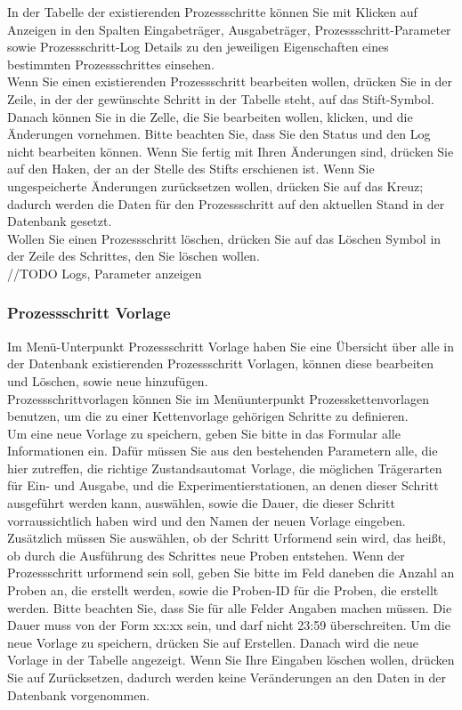 \documentclass[enabledeprecatedfontcommands,fontsize=12pt,paper=a4,twoside]{scrartcl}
\begin{document}
In der Tabelle der existierenden Prozessschritte können Sie mit Klicken auf Anzeigen in den Spalten Eingabeträger, Ausgabeträger, Prozessschritt-Parameter sowie Prozessschritt-Log Details zu den jeweiligen Eigenschaften eines bestimmten Prozessschrittes einsehen. \\

Wenn Sie einen existierenden Prozessschritt bearbeiten wollen, drücken Sie in der Zeile, in der der gewünschte Schritt in der Tabelle steht, auf das Stift-Symbol. Danach können Sie in die Zelle, die Sie bearbeiten wollen, klicken, und die Änderungen vornehmen. Bitte beachten Sie, dass Sie den Status und den Log nicht bearbeiten können. Wenn Sie fertig mit Ihren Änderungen sind, drücken Sie auf den Haken, der an der Stelle des Stifts erschienen ist. Wenn Sie ungespeicherte Änderungen zurücksetzen wollen, drücken Sie auf das Kreuz; dadurch werden die Daten für den Prozessschritt auf den aktuellen Stand in der Datenbank gesetzt. \\


Wollen Sie einen Prozessschritt löschen, drücken Sie auf das Löschen Symbol in der Zeile des Schrittes, den Sie löschen wollen. \\

//TODO Logs, Parameter anzeigen
\subsubsection{Prozessschritt Vorlage}

Im Menü-Unterpunkt Prozessschritt Vorlage haben Sie eine Übersicht über alle in der Datenbank existierenden Prozessschritt Vorlagen, können diese bearbeiten und Löschen, sowie neue hinzufügen. \\

Prozessschrittvorlagen können Sie im Menüunterpunkt Prozesskettenvorlagen benutzen, um die zu einer Kettenvorlage gehörigen Schritte zu definieren. \\

Um eine neue Vorlage zu speichern, geben Sie bitte in das Formular alle Informationen ein. Dafür müssen Sie aus den bestehenden Parametern alle, die hier zutreffen, die richtige Zustandsautomat Vorlage, die möglichen Trägerarten für Ein- und Ausgabe, und die Experimentierstationen, an denen dieser Schritt ausgeführt werden kann, auswählen, sowie die Dauer, die dieser Schritt vorraussichtlich haben wird und den Namen der neuen Vorlage eingeben. Zusätzlich müssen Sie auswählen, ob der Schritt Urformend sein wird, das heißt, ob durch die Ausführung des Schrittes neue Proben entstehen. Wenn der Prozessschritt urformend sein soll, geben Sie bitte im Feld daneben die Anzahl an Proben an, die erstellt werden, sowie die Proben-ID für die Proben, die erstellt werden. Bitte beachten Sie, dass Sie für alle Felder Angaben machen müssen. Die Dauer muss von der Form xx:xx sein, und darf nicht 23:59 überschreiten. Um die neue Vorlage zu speichern, drücken Sie auf Erstellen. Danach wird die neue Vorlage in der Tabelle angezeigt. Wenn Sie Ihre Eingaben löschen wollen, drücken Sie auf Zurücksetzen, dadurch werden keine Veränderungen an den Daten in der Datenbank vorgenommen. \\
\end{document}

